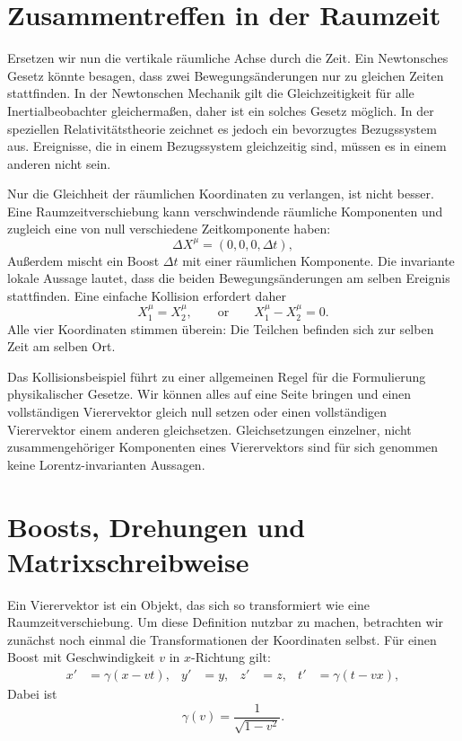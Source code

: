\section{Zusammentreffen in der Raumzeit}

Ersetzen wir nun die vertikale räumliche Achse durch die Zeit. Ein Newtonsches Gesetz könnte besagen, dass zwei Bewegungsänderungen nur zu gleichen Zeiten stattfinden. In der Newtonschen Mechanik gilt die Gleichzeitigkeit für alle Inertialbeobachter gleichermaßen, daher ist ein solches Gesetz möglich. In der speziellen Relativitätstheorie zeichnet es jedoch ein bevorzugtes Bezugssystem aus. Ereignisse, die in einem Bezugssystem gleichzeitig sind, müssen es in einem anderen nicht sein.

Nur die Gleichheit der räumlichen Koordinaten zu verlangen, ist nicht besser. Eine Raumzeitverschiebung kann verschwindende räumliche Komponenten und zugleich eine von null verschiedene Zeitkomponente haben: \begin{equation}
  \Delta X^\mu=(0,0,0,\Delta t),
\end{equation} Außerdem mischt ein Boost \(\Delta t\) mit einer räumlichen Komponente. Die invariante lokale Aussage lautet, dass die beiden Bewegungsänderungen am selben Ereignis stattfinden. Eine einfache Kollision erfordert daher \begin{equation}
  X_1^\mu=X_2^\mu,
  \qquad\text{or}\qquad
  X_1^\mu-X_2^\mu=0.
\end{equation} Alle vier Koordinaten stimmen überein: Die Teilchen befinden sich zur selben Zeit am selben Ort.

Das Kollisionsbeispiel führt zu einer allgemeinen Regel für die Formulierung physikalischer Gesetze. Wir können alles auf eine Seite bringen und einen vollständigen Vierervektor gleich null setzen oder einen vollständigen Vierervektor einem anderen gleichsetzen. Gleichsetzungen einzelner, nicht zusammengehöriger Komponenten eines Vierervektors sind für sich genommen keine Lorentz-invarianten Aussagen.

\section{Boosts, Drehungen und Matrixschreibweise}

Ein Vierervektor ist ein Objekt, das sich so transformiert wie eine Raumzeitverschiebung. Um diese Definition nutzbar zu machen, betrachten wir zunächst noch einmal die Transformationen der Koordinaten selbst. Für einen Boost mit Geschwindigkeit \(v\) in \(x\)-Richtung gilt: \begin{align}
  x'&=\gamma(x-vt), & y'&=y, & z'&=z,
  & t'&=\gamma(t-vx),                                      \label{eq:l6-boost}
\end{align} Dabei ist \begin{equation}
  \gamma(v)=\frac{1}{\sqrt{1-v^2}}.
\end{equation}

